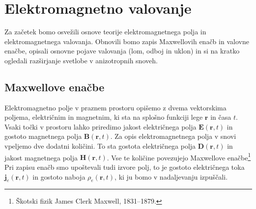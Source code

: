 
\chapter{Elektromagnetno valovanje}
Za začetek bomo osvežili osnove teorije elektromagnetnega polja in 
elektromagnetnega valovanja. Obnovili bomo zapis Maxwellovih enačb in 
valovne enačbe, opisali osnovne pojave valovanja (lom, odboj in uklon)
in si na kratko ogledali razširjanje svetlobe v anizotropnih snoveh. 

\section{Maxwellove enačbe}
Elektromagnetno polje v praznem prostoru opišemo z dvema vektorskima
poljema, električnim in magnetnim, ki sta na splošno funkciji lege $\mathbf{r}$
in časa $t$. Vsaki točki v prostoru lahko priredimo jakost
električnega polja $\mathbf{E}(\mathbf{r},t)$ in gostoto
magnetnega polja $\mathbf{B}(\mathbf{r},t)$. Za opis elektromagnetnega
polja v snovi vpeljemo dve dodatni količini. To sta gostota
električnega polja $\mathbf{D}(\mathbf{r},t)$ in jakost magnetnega
polja $\mathbf{H}(\mathbf{r},t)$.
Vse te količine povezujejo Maxwellove
enačbe\footnote{Škotski fizik James Clerk Maxwell, 1831--1879.}
\\
Pri zapisu enačb smo upoštevali tudi izvore polj, to je gostoto
električnega toka $\mathbf{j}_e(\mathbf{r},t)$ in gostoto naboja $\rho_{e}(\mathbf{r},t)$, ki 
ju bomo v nadaljevanju izpuščali.


